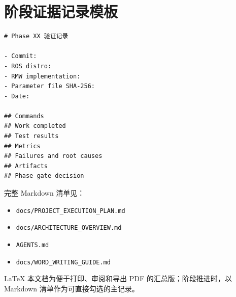 \documentclass[UTF8,a4paper,12pt,fontset=fandol]{ctexart}
\newcommand{\code}[1]{\texttt{#1}}
\begin{document}
\section{阶段证据记录模板}

\begin{lstlisting}
# Phase XX 验证记录

- Commit:
- ROS distro:
- RMW implementation:
- Parameter file SHA-256:
- Date:

## Commands
## Work completed
## Test results
## Metrics
## Failures and root causes
## Artifacts
## Phase gate decision
\end{lstlisting}

\begin{statusbox}[配套源文档]
完整 Markdown 清单见：
\begin{itemize}
  \item \code{docs/PROJECT\_EXECUTION\_PLAN.md}
  \item \code{docs/ARCHITECTURE\_OVERVIEW.md}
  \item \code{AGENTS.md}
  \item \code{docs/WORD\_WRITING\_GUIDE.md}
\end{itemize}
LaTeX 本文档为便于打印、审阅和导出 PDF 的汇总版；阶段推进时，以 Markdown 清单作为可直接勾选的主记录。
\end{statusbox}
\end{document}
